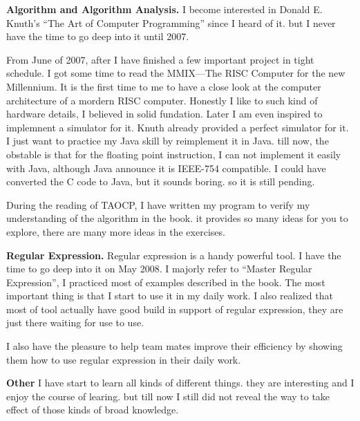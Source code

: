 \medskip\noindent
{\bf Algorithm and Algorithm Analysis.}
I become interested in Donald E. Knuth's ``The Art of Computer Programming'' 
since I heard of it. but I never have the time to go deep into it until 2007.

From June of 2007, after I have finished a few important project in tight 
schedule. I got some time to read the MMIX---The RISC Computer for the new 
Millennium. It is the first time to me to have a close look at the computer 
architecture of a mordern RISC computer. Honestly I like to such kind of 
hardware details, I believed in solid fundation. Later I am even inspired to 
implemnent a simulator for it. Knuth already provided a perfect simulator for 
it. I just want to practice my Java skill by reimplement it in Java. till now, 
the obstable is that for the floating point instruction, I can not implement it
easily with Java, although Java announce it is IEEE-754 compatible.   I could 
have converted the C code to Java, but it sounds  boring. so it is still
 pending. 
 
During the reading of TAOCP, I have written my program to verify my 
understanding
of the algorithm in the book. it provides so many ideas for you to explore, 
there are many more ideas in the exercises. 

\medskip\noident
{\bf Regular Expression.}
Regular expression is a handy powerful tool. I have the time to go deep into it
on May 2008. I majorly refer to ``Master Regular Expression'', I practiced most 
of examples described in the book. The most important thing is that I start to
use it in my daily work. I also realized that most of tool actually have good 
build in
support of regular expression, they are just there waiting for use to use.

I also have the pleasure to help team mates improve their efficiency by showing 
them how to use regular expression in their daily work.

\medskip\noindent
{\bf Other}
I have start to learn all kinds of different things. they are interesting and I
enjoy the course of learing. but till now I still did not reveal the way to 
take effect of those kinds of broad knowledge.   
 
 \bye
